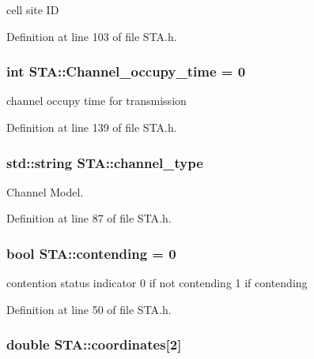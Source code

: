 cell site I\-D 



Definition at line 103 of file S\-T\-A.\-h.

\hypertarget{classSTA_a409c7dfb7f0dd3688fdf655a36cdb9bc}{
\subsubsection[{Channel\-\_\-occupy\-\_\-time}]{\setlength{\rightskip}{0pt plus 5cm}int S\-T\-A\-::\-Channel\-\_\-occupy\-\_\-time = 0}}\label{classSTA_a409c7dfb7f0dd3688fdf655a36cdb9bc}


channel occupy time for transmission 



Definition at line 139 of file S\-T\-A.\-h.

\hypertarget{classSTA_a5d1a873bdd6733103441abadf4db1475}{
\subsubsection[{channel\-\_\-type}]{\setlength{\rightskip}{0pt plus 5cm}std\-::string S\-T\-A\-::channel\-\_\-type\hspace{0.3cm}{\ttfamily [private]}}}\label{classSTA_a5d1a873bdd6733103441abadf4db1475}


Channel Model. 



Definition at line 87 of file S\-T\-A.\-h.

\hypertarget{classSTA_ad4226c80ad37062f9648438bce828089}{
\subsubsection[{contending}]{\setlength{\rightskip}{0pt plus 5cm}bool S\-T\-A\-::contending = 0\hspace{0.3cm}{\ttfamily [private]}}}\label{classSTA_ad4226c80ad37062f9648438bce828089}
contention status indicator 0 if not contending 1 if contending 

Definition at line 50 of file S\-T\-A.\-h.

\hypertarget{classSTA_aba57e1e65b70a3b6f556495e47f6838a}{
\subsubsection[{coordinates}]{\setlength{\rightskip}{0pt plus 5cm}double S\-T\-A\-::coordinates\mbox{[}2\mbox{]}}}\label{classSTA_aba57e1e65b70a3b6f556495e47f6838a}


